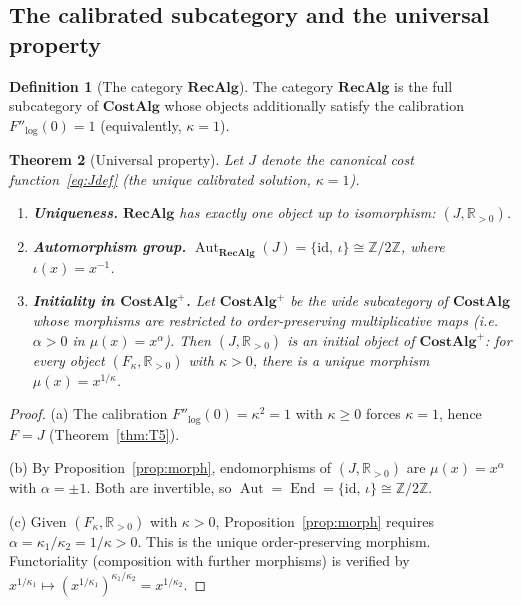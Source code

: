 \documentclass[11pt,a4paper]{article}
\theoremstyle{plain}
\newtheorem{theorem}{Theorem}[section]
\theoremstyle{definition}
\newtheorem{definition}[theorem]{Definition}
\theoremstyle{remark}
\newcommand{\Jcost}{J}
\newcommand{\RR}{\mathbb{R}}
\newcommand{\ZZ}{\mathbb{Z}}
\begin{document}
\subsection{The calibrated subcategory and the universal property}

\begin{definition}[The category $\mathbf{RecAlg}$]\label{def:cat}
The category $\mathbf{RecAlg}$ is the full subcategory of
$\mathbf{CostAlg}$ whose objects additionally satisfy the
calibration $F''_{\!\log}(0)=1$ (equivalently, $\kappa=1$).
\end{definition}

\begin{theorem}[Universal property]\label{thm:initial}
Let $\Jcost$ denote the canonical cost function~\eqref{eq:Jdef}
(the unique calibrated solution, $\kappa=1$).
\begin{enumerate}[nosep,label=\textup{(\alph*)}]
\item \textbf{Uniqueness.}
  $\mathbf{RecAlg}$ has exactly one object up to isomorphism:
  $(\Jcost,\RR_{>0})$.
\item \textbf{Automorphism group.}
  $\operatorname{Aut}_{\mathbf{RecAlg}}(\Jcost)
  =\{\mathrm{id},\,\iota\}\cong\ZZ/2\ZZ$, where
  $\iota(x)=x^{-1}$.
\item \textbf{Initiality in $\mathbf{CostAlg}^{+}$.}
  Let $\mathbf{CostAlg}^{+}$ be the wide subcategory of
  $\mathbf{CostAlg}$ whose morphisms are restricted to
  \emph{order-preserving} multiplicative maps (i.e.\ $\alpha>0$
  in $\mu(x)=x^\alpha$).  Then $(\Jcost,\RR_{>0})$ is an
  \emph{initial object} of $\mathbf{CostAlg}^{+}$: for every
  object $(F_\kappa,\RR_{>0})$ with $\kappa>0$, there is a
  unique morphism $\mu(x)=x^{1/\kappa}$.
\end{enumerate}
\end{theorem}

\begin{proof}
(a) The calibration $F''_{\!\log}(0)=\kappa^2=1$ with $\kappa\ge0$
forces $\kappa=1$, hence $F=\Jcost$ (Theorem~\ref{thm:T5}).

(b) By Proposition~\ref{prop:morph}, endomorphisms of
$(\Jcost,\RR_{>0})$ are $\mu(x)=x^\alpha$ with
$\alpha=\pm1$.  Both are invertible, so
$\operatorname{Aut}=\operatorname{End}
=\{\mathrm{id},\,\iota\}\cong\ZZ/2\ZZ$.

(c) Given $(F_\kappa,\RR_{>0})$ with $\kappa>0$,
Proposition~\ref{prop:morph} requires $\alpha=\kappa_1/\kappa_2
=1/\kappa>0$.  This is the unique order-preserving morphism.
Functoriality (composition with further morphisms) is verified by
$x^{1/\kappa_1}\mapsto (x^{1/\kappa_1})^{\kappa_1/\kappa_2}
=x^{1/\kappa_2}$.
\end{proof}
\end{document}
